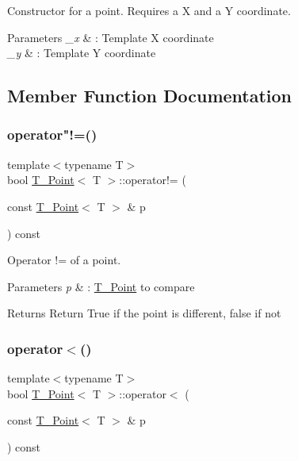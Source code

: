 Constructor for a point. Requires a X and a Y coordinate. 


\begin{DoxyParams}{Parameters}
{\em \+\_\+x} & \+: Template X coordinate \\
\hline
{\em \+\_\+y} & \+: Template Y coordinate \\
\hline
\end{DoxyParams}


\subsection{Member Function Documentation}
\mbox{\label{classPoint_ac0b85ea22cdadeed30c4a8db0cfc76f9}} 
\subsubsection{\texorpdfstring{operator"!=()}{operator!=()}}
{\footnotesize\ttfamily template$<$typename T$>$ \\
bool \hyperlink{classPoint}{T_Point}$<$ T $>$\+::operator!= (\begin{DoxyParamCaption}\item[{const \hyperlink{classPoint}{T_Point}$<$ T $>$ \&}]{p }\end{DoxyParamCaption}) const\hspace{0.3cm}{\ttfamily [inline]}}



Operator != of a point. 


\begin{DoxyParams}{Parameters}
{\em p} & \+: \hyperlink{classPoint}{T_Point} to compare \\
\hline
\end{DoxyParams}
\begin{DoxyReturn}{Returns}
Return True if the point is different, false if not 
\end{DoxyReturn}
\mbox{\label{classPoint_a4871508a56f646b8e95cd11257ea093e}} 
\subsubsection{\texorpdfstring{operator$<$()}{operator<()}}
{\footnotesize\ttfamily template$<$typename T$>$ \\
bool \hyperlink{classPoint}{T_Point}$<$ T $>$\+::operator$<$ (\begin{DoxyParamCaption}\item[{const \hyperlink{classPoint}{T_Point}$<$ T $>$ \&}]{p }\end{DoxyParamCaption}) const\hspace{0.3cm}{\ttfamily [inline]}}



